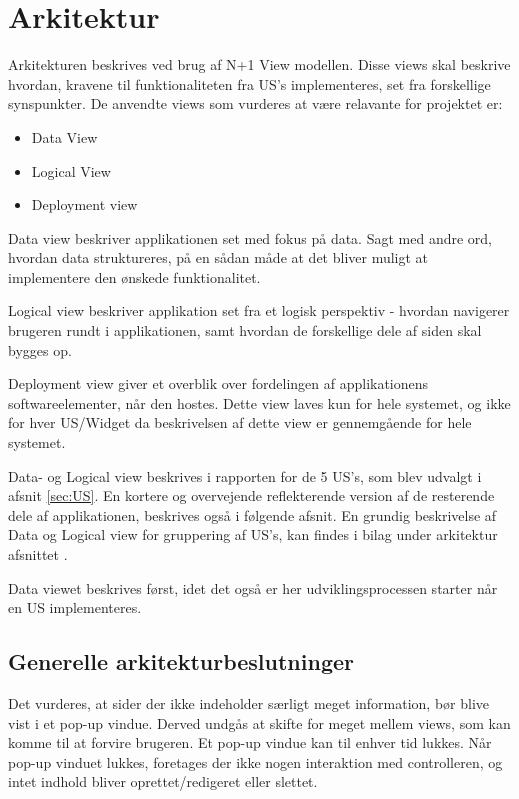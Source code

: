 \chapter{Arkitektur} \label{chp:arkitektur}
Arkitekturen beskrives ved brug af N+1 View modellen. Disse views skal beskrive hvordan, kravene til funktionaliteten fra US's implementeres, set fra forskellige synspunkter. De anvendte views som vurderes at være relavante for projektet er:
\begin{itemize}
    \item Data View
    \item Logical View
    \item Deployment view
\end{itemize}

Data view beskriver applikationen set med fokus på data. Sagt med andre ord, hvordan data struktureres, på en sådan måde at det bliver muligt at implementere den ønskede funktionalitet.

Logical view beskriver applikation set fra et logisk perspektiv - hvordan navigerer brugeren rundt i applikationen, samt hvordan de forskellige dele af siden skal bygges op. 

Deployment view giver et overblik over fordelingen af applikationens softwareelementer, når den hostes. Dette view laves kun for hele systemet, og ikke for hver US/Widget da beskrivelsen af dette view er gennemgående for hele systemet.

Data- og Logical view beskrives i rapporten for de 5 US's, som blev udvalgt i afsnit \ref{sec:US}. En kortere og overvejende reflekterende version af de resterende dele af applikationen, beskrives også i følgende afsnit. En grundig beskrivelse af Data og Logical view for gruppering af US's, kan findes i bilag under arkitektur afsnittet \cite{ArkitekturOverordnet}.

Data viewet beskrives først, idet det også er her udviklingsprocessen starter når en US implementeres.

\section{Generelle arkitekturbeslutninger}
Det vurderes, at sider der ikke indeholder særligt meget information, bør blive vist i et pop-up vindue. Derved undgås at skifte for meget mellem views, som kan komme til at forvire brugeren. Et pop-up vindue kan til enhver tid lukkes. Når pop-up vinduet lukkes, foretages der ikke nogen interaktion med controlleren, og intet indhold bliver oprettet/redigeret eller slettet.










